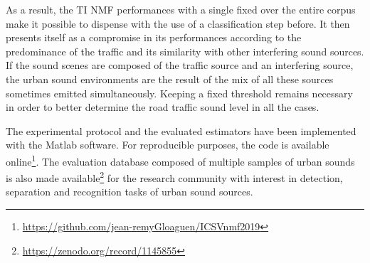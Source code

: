 \documentclass[12pt,english,twoside]{article}
\begin{document}
As a result, the TI NMF performances with a single fixed over the entire corpus make it possible to dispense with the use of a classification step before. It then presents itself as a compromise in its performances according to the predominance of the traffic and its similarity with other interfering sound sources. If the sound scenes are composed of the traffic source and an interfering source, the urban sound environments are the result of the mix of all these sources sometimes emitted simultaneously. Keeping a fixed threshold remains necessary in order to better determine the road traffic sound level in all the cases.

The experimental protocol and the evaluated estimators have been implemented with the Matlab software.
For reproducible purposes, the code is available
online\footnote{\url{https://github.com/jean-remyGloaguen/ICSVnmf2019}}. The evaluation database composed of multiple samples of urban sounds is also made available\footnote{\url{https://zenodo.org/record/1145855}} for the research community with interest in detection, separation and recognition tasks of urban sound sources.
\end{document}
